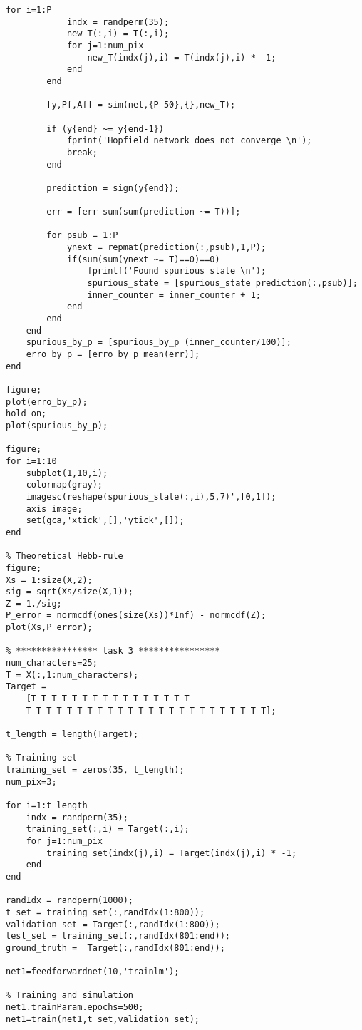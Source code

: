 \begin{lstlisting}[frame=single]
        for i=1:P
            indx = randperm(35);
            new_T(:,i) = T(:,i);
            for j=1:num_pix
                new_T(indx(j),i) = T(indx(j),i) * -1;
            end
        end
    
        [y,Pf,Af] = sim(net,{P 50},{},new_T);
        
        if (y{end} ~= y{end-1})
            fprint('Hopfield network does not converge \n');
            break;
        end
        
        prediction = sign(y{end});
    
        err = [err sum(sum(prediction ~= T))];
        
        for psub = 1:P
            ynext = repmat(prediction(:,psub),1,P);
            if(sum(sum(ynext ~= T)==0)==0)
                fprintf('Found spurious state \n');
                spurious_state = [spurious_state prediction(:,psub)];
                inner_counter = inner_counter + 1;
            end
        end
    end   
    spurious_by_p = [spurious_by_p (inner_counter/100)];
    erro_by_p = [erro_by_p mean(err)];
end

figure;
plot(erro_by_p);
hold on;
plot(spurious_by_p);

figure;
for i=1:10
    subplot(1,10,i);
    colormap(gray);
    imagesc(reshape(spurious_state(:,i),5,7)',[0,1]);
    axis image;
    set(gca,'xtick',[],'ytick',[]);
end

% Theoretical Hebb-rule
figure;
Xs = 1:size(X,2);
sig = sqrt(Xs/size(X,1));
Z = 1./sig;
P_error = normcdf(ones(size(Xs))*Inf) - normcdf(Z);
plot(Xs,P_error);

% **************** task 3 ****************
num_characters=25;
T = X(:,1:num_characters);
Target = 
    [T T T T T T T T T T T T T T T T 
    T T T T T T T T T T T T T T T T T T T T T T T T];

t_length = length(Target);

% Training set
training_set = zeros(35, t_length);
num_pix=3;

for i=1:t_length
    indx = randperm(35);
    training_set(:,i) = Target(:,i);
    for j=1:num_pix
        training_set(indx(j),i) = Target(indx(j),i) * -1;
    end
end

randIdx = randperm(1000);
t_set = training_set(:,randIdx(1:800));
validation_set = Target(:,randIdx(1:800));
test_set = training_set(:,randIdx(801:end));
ground_truth =  Target(:,randIdx(801:end));

net1=feedforwardnet(10,'trainlm');

% Training and simulation
net1.trainParam.epochs=500;
net1=train(net1,t_set,validation_set);


\end{lstlisting}
